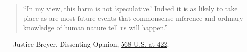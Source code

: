 \documentclass[12pt]{article}
\begin{document}
\begin{quote}
``In my view, this harm is not `speculative.' Indeed it is as likely to take place as are most future events that commonsense inference and ordinary knowledge of human nature tell us will happen.''
\end{quote}
\noindent --- Justice Breyer, Dissenting Opinion, \href{https://supreme.justia.com/cases/federal/us/568/398/}{568 U.S. at 422}.
\end{document}
